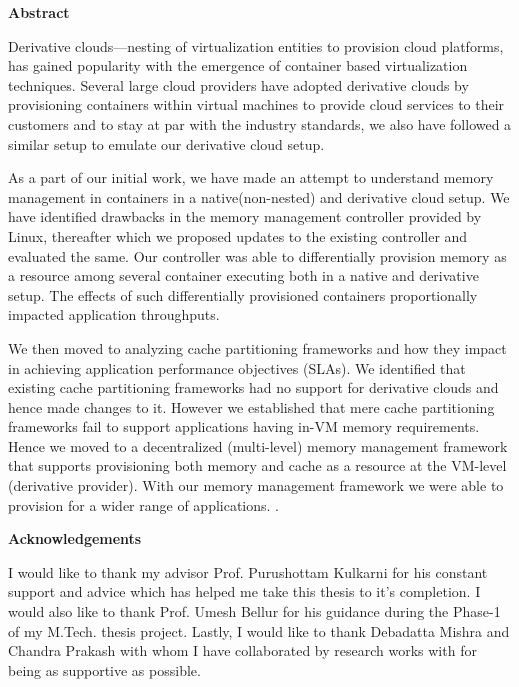 \documentclass[11pt,a4paper]{report}
\begin{document}
  \begin{center}
    \huge \textbf{Abstract}
  \end{center}
  \vspace*{3em}
  \normalsize 
    
    Derivative clouds---nesting of virtualization entities to provision cloud platforms, has gained popularity 
    with the emergence of container based virtualization techniques. Several large cloud providers have adopted derivative 
    clouds by provisioning containers within virtual machines to provide cloud services to their 
    customers and to stay at par with the industry standards, we also have followed a similar setup to emulate our derivative 
    cloud setup.
    
    As a part of our initial work, we have made an attempt to understand memory management in containers in a native(non-nested)
    and derivative cloud setup. We have identified drawbacks in the memory management controller provided by Linux, thereafter which
    we proposed updates to the existing controller and evaluated the same. Our controller was able to differentially provision memory as
    a resource among several container executing both in a native and derivative setup. The effects of such differentially 
    provisioned containers proportionally impacted application throughputs.
    
    We then moved to analyzing cache partitioning frameworks and how they impact in achieving application performance 
    objectives (SLAs). We identified that existing cache partitioning frameworks had no support for derivative clouds and
    hence made changes to it. However we established that mere cache partitioning frameworks fail to support applications 
    having in-VM memory requirements. Hence we moved to a decentralized (multi-level) memory management framework that
    supports provisioning both memory and cache as a resource at the VM-level (derivative provider). With our memory 
    management framework we were able to provision for a wider range of applications. 
  . 
    
    \newpage
    \begin{center}
      \huge \textbf{Acknowledgements}
    \end{center}
    \vspace*{3em}
    \normalsize 
    
    I would like to thank my advisor Prof. Purushottam Kulkarni for his constant support and advice which has helped me take 
    this thesis to it’s completion. I would also like to thank Prof. Umesh Bellur for his guidance during the Phase-1 of my 
    M.Tech. thesis project. Lastly, I would like to thank Debadatta Mishra and Chandra Prakash with whom I have collaborated by 
    research works with for being as supportive as possible.
    
\end{document}

